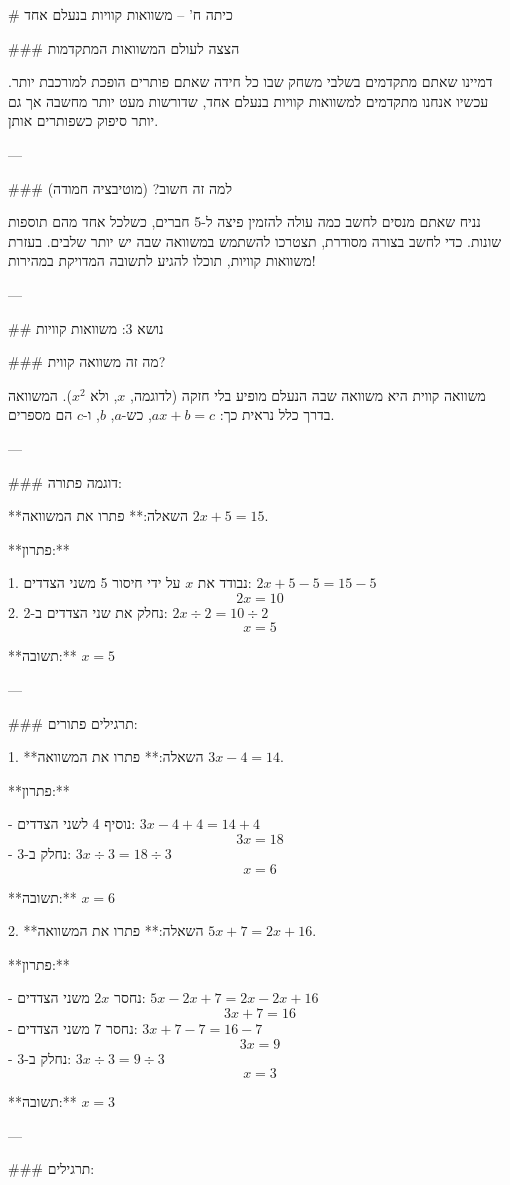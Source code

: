 # כיתה ח' – משוואות קוויות בנעלם אחד

### הצצה לעולם המשוואות המתקדמות

דמיינו שאתם מתקדמים בשלבי משחק שבו כל חידה שאתם פותרים הופכת למורכבת יותר. עכשיו אנחנו מתקדמים למשוואות קוויות בנעלם אחד, שדורשות מעט יותר מחשבה אך גם יותר סיפוק כשפותרים אותן.

---

### למה זה חשוב? (מוטיבציה חמודה)

נניח שאתם מנסים לחשב כמה עולה להזמין פיצה ל-5 חברים, כשלכל אחד מהם תוספות שונות. כדי לחשב בצורה מסודרת, תצטרכו להשתמש במשוואה שבה יש יותר שלבים. בעזרת משוואות קוויות, תוכלו להגיע לתשובה המדויקת במהירות!

---

## נושא 3: משוואות קוויות

### מה זה משוואה קווית?

משוואה קווית היא משוואה שבה הנעלם מופיע בלי חזקה (לדוגמה, $x$, ולא $x^2$). המשוואה בדרך כלל נראית כך: $ax + b = c$, כש-$a$, $b$, ו-$c$ הם מספרים.

---

### דוגמה פתורה:

**השאלה:**
פתרו את המשוואה $2x + 5 = 15$.

**פתרון:**

1. נבודד את $x$ על ידי חיסור 5 משני הצדדים:
   $2x + 5 - 5 = 15 - 5$
   $$
   2x = 10
   $$
2. נחלק את שני הצדדים ב-2:
   $2x \div 2 = 10 \div 2$
   $$
   x = 5
   $$

**תשובה:** $x = 5$

---

### תרגילים פתורים:

1. **השאלה:**
פתרו את המשוואה $3x - 4 = 14$.

**פתרון:**

- נוסיף 4 לשני הצדדים:
  $3x - 4 + 4 = 14 + 4$
  $$
  3x = 18
  $$
- נחלק ב-3:
  $3x \div 3 = 18 \div 3$
  $$
  x = 6
  $$

**תשובה:** $x = 6$

2. **השאלה:**
פתרו את המשוואה $5x + 7 = 2x + 16$.

**פתרון:**

- נחסר $2x$ משני הצדדים:
  $5x - 2x + 7 = 2x - 2x + 16$
  $$
  3x + 7 = 16
  $$
- נחסר 7 משני הצדדים:
  $3x + 7 - 7 = 16 - 7$
  $$
  3x = 9
  $$
- נחלק ב-3:
  $3x \div 3 = 9 \div 3$
  $$
  x = 3
  $$

**תשובה:** $x = 3$

---

### תרגילים:

